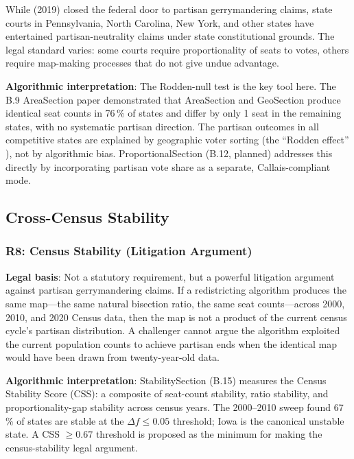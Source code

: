 While \rucho{} (2019) closed the federal door to partisan gerrymandering claims,
state courts in Pennsylvania, North Carolina, New York, and other states have
entertained partisan-neutrality claims under state constitutional grounds.
The legal standard varies: some courts require proportionality of seats to votes,
others require map-making processes that do not give undue advantage.

\textbf{Algorithmic interpretation}: The Rodden-null test is the key tool here.
The B.9 AreaSection paper demonstrated that AreaSection and GeoSection produce
identical seat counts in 76\,\% of states and differ by only 1 seat in the
remaining states, with no systematic partisan direction.
The partisan outcomes in all competitive states are explained by geographic
voter sorting (the ``Rodden effect'' \citep{rodden2019}), not by algorithmic bias.
ProportionalSection (B.12, planned) addresses this directly by incorporating
partisan vote share as a separate, Callais-compliant mode.

\subsection{Cross-Census Stability}

\subsubsection*{R8: Census Stability (Litigation Argument)}

\textbf{Legal basis}: Not a statutory requirement, but a powerful litigation
argument against partisan gerrymandering claims.
If a redistricting algorithm produces the same map---the same natural bisection
ratio, the same seat counts---across 2000, 2010, and 2020 Census data, then
the map is not a product of the current census cycle's partisan distribution.
A challenger cannot argue the algorithm exploited the current population counts
to achieve partisan ends when the identical map would have been drawn from
twenty-year-old data.

\textbf{Algorithmic interpretation}: StabilitySection (B.15) measures the Census
Stability Score (CSS): a composite of seat-count stability, ratio stability, and
proportionality-gap stability across census years.
The 2000--2010 sweep found 67\,\% of states are stable at the $\Delta f \leq 0.05$
threshold; Iowa is the canonical unstable state.
A CSS $\geq 0.67$ threshold is proposed as the minimum for making the
census-stability legal argument.

